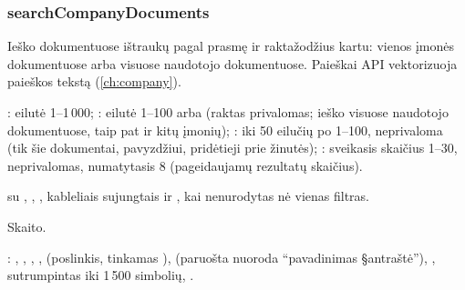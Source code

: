 \subsubsection{searchCompanyDocuments}\label{sec:tools:searchCompanyDocuments}
\begin{description}[style=multiline, leftmargin=19mm, labelwidth=17mm, labelsep=2mm,
  font=\sffamily\bfseries\footnotesize\color{ink}, itemsep=1pt, topsep=2pt, before=\raggedright]
  \item[Paskirtis] Ieško dokumentuose ištraukų pagal prasmę ir raktažodžius kartu: vienos
    įmonės dokumentuose arba visuose naudotojo dokumentuose. Paieškai API vektorizuoja paieškos
    tekstą (\cref{ch:company}).
  \item[Įvestis] : eilutė 1--1\,000; : eilutė 1--100 arba
     (raktas privalomas;  ieško visuose naudotojo dokumentuose, taip pat
    ir kitų įmonių); : iki 50 eilučių po 1--100, neprivaloma (tik šie
    dokumentai, pavyzdžiui, pridėtieji prie žinutės); :
    sveikasis skaičius 1--30, neprivalomas, numatytasis 8 (pageidaujamų rezultatų skaičius).
  \item[Užklausos]  su , ,
    , kableliais sujungtais  ir , kai nenurodytas
    nė vienas filtras.
  \item[Pobūdis] Skaito.
  \item[Grąžina] : , , ,
    ,  (poslinkis, tinkamas ), 
    (paruošta nuoroda \enquote{pavadinimas §antraštė}), , sutrumpintas iki
    1\,500 simbolių, .
\end{description}

